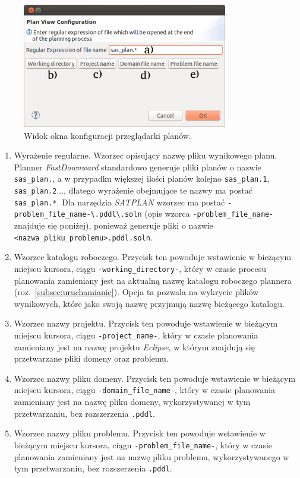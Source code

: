 \begin{enumerate}
\begin{figure}[h!]
    \centering
    \includegraphics[width=0.8\textwidth]{img/plan_view_dialog}
    \caption{Widok okna konfiguracji przeglądarki planów.}
    \label{fig:plan_view_window}
\end{figure}
\begin{enumerate}
\item Wyrażenie regularne. Wzorzec opisujący nazwę pliku wynikowego planu. Planner \textit{FastDownward} standardowo generuje pliki planów o nazwie \texttt{sas\_plan.}, a w przypadku większej ilości planów kolejno \texttt{sas\_plan.1}, \texttt{sas\_plan.2}..., dlatego wyrażenie obejmujące te nazwy ma postać \texttt{sas\_plan.*}. Dla narzędzia \textit{SATPLAN} wzorzec ma postać \texttt{-problem\_file\_name-\textbackslash.pddl\textbackslash.soln} (opis wzorca \texttt{-problem\_file\_name-} znajduje się poniżej), ponieważ generuje pliki o nazwie \texttt{<nazwa\_pliku\_problemu>.pddl.soln}.
\item Wzorzec katalogu roboczego. Przycisk ten powoduje wstawienie w bieżącym miejscu kursora, ciągu \texttt{-working\_directory-}, który w czasie procesu planowania zamieniany jest na aktualną nazwę katalogu roboczego plannera (roz.~\ref{subsec:uruchamianie}). Opcja ta pozwala na wykrycie plików wynikowych, które jako swoją nazwę przyjmują nazwę bieżącego katalogu.
\item Wzorzec nazwy projektu. Przycisk ten powoduje wstawienie w bieżącym miejscu kursora, ciągu \texttt{-project\_name-}, który w czasie planowania zamieniany jest na nazwę projektu \textit{Eclipse}, w którym znajdują się przetwarzane pliki domeny oraz problemu.
\item Wzorzec nazwy pliku domeny. Przycisk ten powoduje wstawienie w bieżącym miejscu kursora, ciągu \texttt{-domain\_file\_name-}, który w czasie planowania zamieniany jest na nazwę pliku domeny, wykorzystywanej w tym przetwarzaniu, bez rozszerzenia \texttt{.pddl}.
\item Wzorzec nazwy pliku problemu. Przycisk ten powoduje wstawienie w bieżącym miejscu kursora, ciągu \texttt{-problem\_file\_name-}, który w czasie planowania zamieniany jest na nazwę pliku problemu, wykorzystywanego w tym przetwarzaniu, bez rozszerzenia \texttt{.pddl}.
\end{enumerate}
\end{enumerate}

